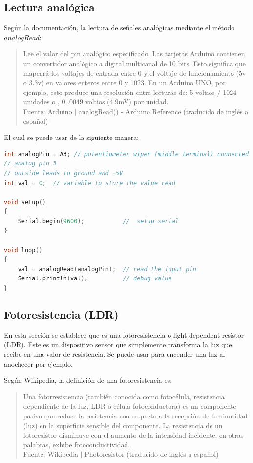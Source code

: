 \documentclass{article}
\begin{document}
\subsection{Lectura analógica}

Según la documentación, la lectura de señales analógicas mediante el método
$analogRead$:

\begin{quote}
Lee el valor del pin analógico especificado. Las tarjetas Arduino contienen
un convertidor analógico a digital multicanal de 10 bits. Esto significa que
mapeará los voltajes de entrada entre 0 y el voltaje de funcionamiento (5v o
3.3v) en valores enteros entre 0 y 1023. En un Arduino UNO, por ejemplo, esto
produce una resolución entre lecturas de: 5 voltios / 1024 unidades o , 0
.0049 voltios (4.9mV) por unidad. \\ \footnotesize
Fuente: Arduino $\mid$ analogRead() - Arduino Reference (traducido de inglés
a español) \cite{arduino-analogRead}
\end{quote}

El cual se puede usar de la siguiente manera:

\begin{lstlisting}[language=C, caption=Uso del método analogRead.
\footnotesize Fuente: analogRead() - Arduino Reference
\cite{arduino-analogRead}]
int analogPin = A3; // potentiometer wiper (middle terminal) connected to
// analog pin 3
// outside leads to ground and +5V
int val = 0;  // variable to store the value read

void setup()
{
    Serial.begin(9600);           //  setup serial
}

void loop()
{
    val = analogRead(analogPin);  // read the input pin
    Serial.println(val);          // debug value
}
\end{lstlisting}

\subsection{Fotoresistencia (LDR)}

En esta sección se establece que es una fotoresistencia o light-dependent
resistor (LDR). Este es un dispositivo sensor que simplemente transforma la
luz que recibe en una valor de resistencia. Se puede usar para encender una
luz al anochecer por ejemplo.

\bigbreak

Según Wikipedia, la definición de una fotoresistencia es:

\begin{quote}
Una fotorresistencia (también conocida como fotocélula, resistencia
dependiente de la luz, LDR o célula fotoconductora) es un componente pasivo
que reduce la resistencia con respecto a la recepción de luminosidad (luz) en
la superficie sensible del componente. La resistencia de un fotoresistor
disminuye con el aumento de la intensidad incidente; en otras palabras,
exhibe fotoconductividad.\\ \footnotesize
Fuente: Wikipedia $\mid$ Photoresistor (traducido de inglés a español)
\cite{wikipedia-ldr-2022}
\end{quote}
\end{document}
